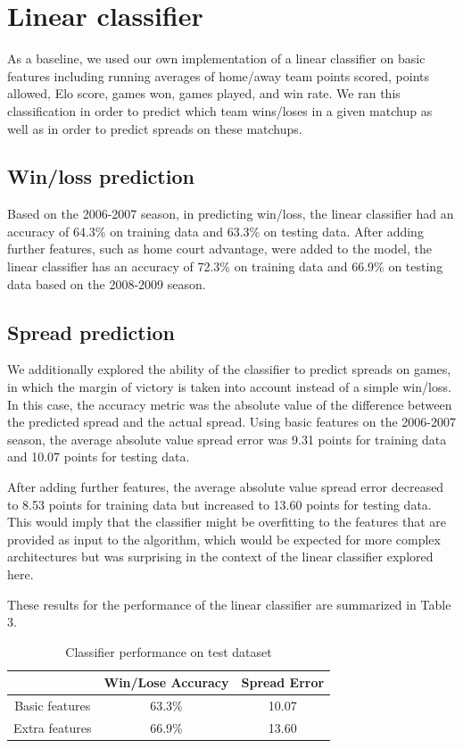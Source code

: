\documentclass{article}
\begin{document}
\section{Linear classifier}
As a baseline, we used our own implementation of a linear classifier on basic features including running averages of home/away team points scored, points allowed, Elo score, games won, games played, and win rate. We ran this classification in order to predict which team wins/loses in a given matchup as well as in order to predict spreads on these matchups.

\subsection{Win/loss prediction}
Based on the 2006-2007 season, in predicting win/loss, the linear classifier had an accuracy of 64.3\% on training data and 63.3\% on testing data. After adding further features, such as home court advantage, were added to the model, the linear classifier has an accuracy of 72.3\% on training data and 66.9\% on testing data based on the 2008-2009 season.

\subsection{Spread prediction}

We additionally explored the ability of the classifier to predict spreads on games, in which the margin of victory is taken into account instead of a simple win/loss. In this case, the accuracy metric was the absolute value of the difference between the predicted spread and the actual spread. Using basic features on the 2006-2007 season, the average absolute value spread error was 9.31 points for training data and 10.07 points for testing data.

After adding further features, the average absolute value spread error decreased to 8.53 points for training data but increased to 13.60 points for testing data. This would imply that the classifier might be overfitting to the features that are provided as input to the algorithm, which would be expected for more complex architectures but was surprising in the context of the linear classifier explored here.

These results for the performance of the linear classifier are summarized in Table 3.
\begin{table}
  \begin{center}
    \begin{tabular}{ | c | c | c | }
      \hline
                      & Win/Lose Accuracy & Spread Error  \\ \hline
      Basic features  & 63.3\%            & 10.07         \\ \hline
      Extra features  & 66.9\%            & 13.60         \\ \hline
    \end{tabular}
  \end{center}
  \caption{Classifier performance on test dataset}
\end{table}
\end{document}
